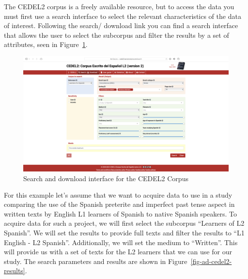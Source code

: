 \documentclass[
  letterpaper,
  DIV=11,
  numbers=noendperiod]{scrreport}
\theoremstyle{definition}
\theoremstyle{remark}
\begin{document}
The CEDEL2 corpus is a freely available resource, but to access the data
you must first use a search interface to select the relevant
characteristics of the data of interest. Following the search/ download
link you can find a search interface that allows the user to select the
subcorpus and filter the results by a set of attributes, seen in
Figure~\ref{fig-ad-cedel2-search}.

\begin{figure}[H]

{\centering \includegraphics[width=1\textwidth,height=\textheight]{figures/acquire-data/ad-cedel2-search.png}

}

\caption{\label{fig-ad-cedel2-search}Search and download interface for
the CEDEL2 Corpus}

\end{figure}

For this example let's assume that we want to acquire data to use in a
study comparing the use of the Spanish preterite and imperfect past
tense aspect in written texts by English L1 learners of Spanish to
native Spanish speakers. To acquire data for such a project, we will
first select the subcorpus ``Learners of L2 Spanish''. We will set the
results to provide full texts and filter the results to ``L1 English -
L2 Spanish''. Additionally, we will set the medium to ``Written''. This
will provide us with a set of texts for the L2 learners that we can use
for our study. The search parameters and results are shown in
Figure~\ref{fig-ad-cedel2-results}.
\end{document}
